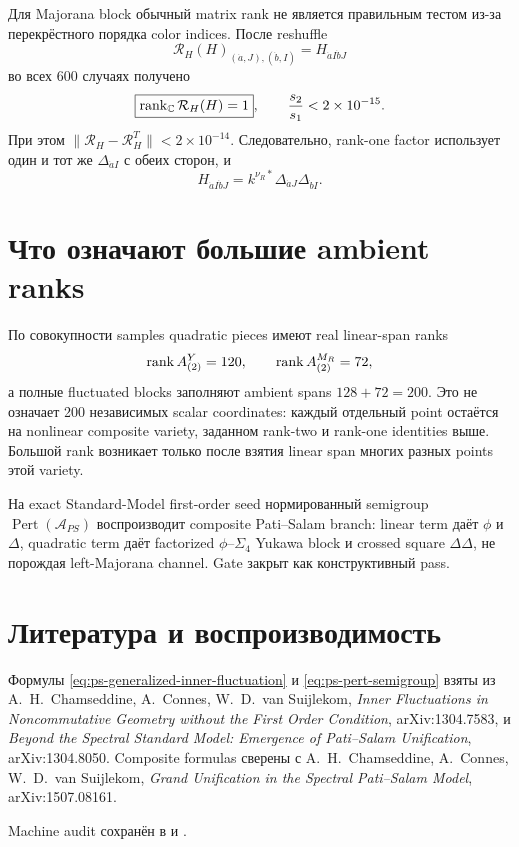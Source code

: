 Для Majorana block обычный matrix rank не является правильным тестом из-за
перекрёстного порядка color indices. После reshuffle
\begin{equation}
 \mathcal R_H(H)_{(\dot a,J),(\dot b,I)}=H_{\dot a I\dot bJ}
\end{equation}
во всех 600 случаях получено
\begin{equation}
 \boxed{\operatorname{rank}_\mathbb C\mathcal R_H(H)=1},
 \qquad
 \frac{s_2}{s_1}<2\times10^{-15}.
\end{equation}
При этом \(\|\mathcal R_H-\mathcal R_H^T\|<2\times10^{-14}\).
Следовательно, rank-one factor использует один и тот же
\(\Delta_{\dot aI}\) с обеих сторон, и
\begin{equation}
 \boxed{
 H_{\dot a I\dot bJ}
 =k^{\nu_R*}\Delta_{\dot aJ}\Delta_{\dot bI}.}
 \label{eq:ps-composite-majorana-confirmed}
\end{equation}

\section{Что означают большие ambient ranks}

По совокупности samples quadratic pieces имеют real linear-span ranks
\begin{equation}
 \operatorname{rank} A_{(2)}^Y=120,
 \qquad
 \operatorname{rank} A_{(2)}^{M_R}=72,
\end{equation}
а полные fluctuated blocks заполняют ambient spans \(128+72=200\).
Это не означает 200 независимых scalar coordinates: каждый отдельный point
остаётся на nonlinear composite variety, заданном rank-two и rank-one
identities выше. Большой rank возникает только после взятия linear span
многих разных points этой variety.

\begin{theorem}
На exact Standard-Model first-order seed нормированный semigroup
\(\operatorname{Pert}(\mathcal A_{PS})\) воспроизводит composite
Pati--Salam branch: linear term даёт \(\phi\) и \(\Delta\), quadratic term
даёт factorized \(\phi\)--\(\Sigma_4\) Yukawa block и crossed square
\(\Delta\Delta\), не порождая left-Majorana channel. Gate закрыт как
конструктивный pass.
\end{theorem}

\section{Литература и воспроизводимость}

Формулы \eqref{eq:ps-generalized-inner-fluctuation} и
\eqref{eq:ps-pert-semigroup} взяты из A.~H.~Chamseddine, A.~Connes,
W.~D.~van Suijlekom, \emph{Inner Fluctuations in Noncommutative Geometry
without the First Order Condition}, arXiv:1304.7583, и
\emph{Beyond the Spectral Standard Model: Emergence of Pati--Salam
Unification}, arXiv:1304.8050. Composite formulas сверены с
A.~H.~Chamseddine, A.~Connes, W.~D.~van Suijlekom,
\emph{Grand Unification in the Spectral Pati--Salam Model},
arXiv:1507.08161.

Machine audit сохранён в
 и
.